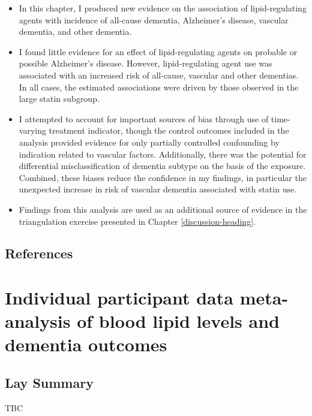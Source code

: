 \documentclass[a4paper, twoside]{templates/ociamthesis}
\begin{document}
\begin{itemize}
\item
  In this chapter, I produced new evidence on the association of lipid-regulating agents with incidence of all-cause dementia, Alzheimer's disease, vascular dementia, and other dementia.
\item
  I found little evidence for an effect of lipid-regulating agents on probable or possible Alzheimer's disease. However, lipid-regulating agent use was associated with an increased risk of all-cause, vascular and other dementias. In all cases, the estimated associations were driven by those observed in the large statin subgroup.
\item
  I attempted to account for important sources of bias through use of time-varying treatment indicator, though the control outcomes included in the analysis provided evidence for only partially controlled confounding by indication related to vascular factors. Additionally, there was the potential for differential misclassification of dementia subtype on the basis of the exposure. Combined, these biases reduce the confidence in my findings, in particular the unexpected increase in risk of vascular dementia associated with statin use.
\item
  Findings from this analysis are used as an additional source of evidence in the triangulation exercise presented in Chapter \ref{discussion-heading}.
\end{itemize}

\newpage

\hypertarget{references-4}{%
\section{References}\label{references-4}}



\hypertarget{ipd-heading}{%
\chapter{Individual participant data meta-analysis of blood lipid levels and dementia outcomes}\label{ipd-heading}}

\minitoc 

\hypertarget{lay-summary-5}{%
\section{Lay Summary}\label{lay-summary-5}}

TBC
\end{document}

